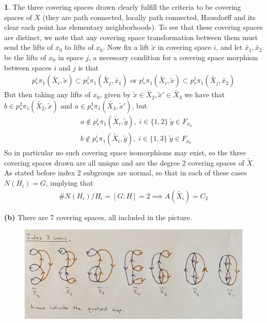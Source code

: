 \documentclass[10.5pt]{article}
\theoremstyle{definition}
\newtheorem{pb}{}
\newcommand{\set}[1]{\{#1\}}
\newcommand{\tand}{\text{ and }}
\newcommand{\tor}{\text{ or }}
\begin{document}
\begin{pb}
        
        The three covering spaces drawn clearly fulfill the criteria to be covering spaces of \(X\) (they are path connected, locally path connected, Hausdorff and its clear each point has elementary neighborhoods). To see that these covering spaces are distinct, we note that any covering space transformation between them must send the lifts of \(x_0\) to lifts of \(x_0\). Now fix a lift \(\tilde{x}\) in covering space \(i\), and let \(\tilde{x_1}, \tilde{x_2}\) be the lifts of \(x_0\) in space \(j\), a necessary condition for a covering space morphism between spaces \(i\) and \(j\) is that
        \begin{align*}
            p^i_*\pi_1(\tilde{X_i},\tilde{x}) \subset p^j_*\pi_1(\tilde{X_j},\tilde{x_1}) \tor p^i_*\pi_1(\tilde{X_i},\tilde{x}) \subset p^j_*\pi_1(\tilde{X_j},\tilde{x_2})
        \end{align*}
        But then taking any lifts of \(x_0\), given by \(\tilde{x} \in \tilde{X_2}, \tilde{x}' \in \tilde{X_3}\) we have that \(b \in p^2_*\pi_1(\tilde{X_2},\tilde{x}) \tand a \in p^3_*\pi_1(\tilde{X_3},\tilde{x}')\), but
        \begin{align*}
            &a \not \in p^i_*\pi_1(\tilde{X_i},\tilde{y}), \; i \in \set{1,2} \; \tilde{y} \in F_{x_0} \\
            &b \not \in p^i_*\pi_1(\tilde{X_i},\tilde{y}), \; i \in \set{1,3} \; \tilde{y} \in F_{x_0}
        \end{align*}
        So in particular no such covering space isomorphisms may exist, so the three covering spaces drawn are all unique and are the degree 2 covering spaces of \(\tilde{X}\). As stated before index 2 subgroups are normal, so that in each of these cases \(N(H_i) = G\), implying that
        \begin{align*}
            \# N(H_i)/H_i = [G:H] = 2 \implies A(\tilde{X_i}) = C_2
        \end{align*}
        \newpage

        \textbf{(b)} There are 7 covering spaces, all included in the picture.

        \begin{figure}[h]
            \centering
            \includegraphics[width = \textwidth]{graphics/Degree 3 covers.jpg}
        \end{figure}
        

\end{pb}
\end{document}
